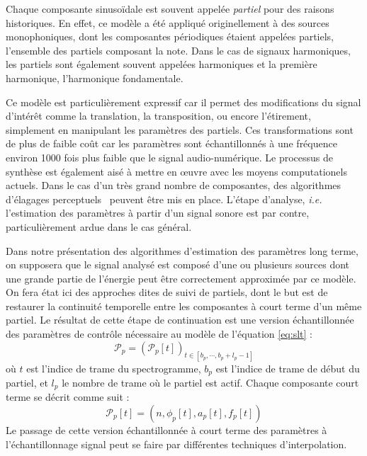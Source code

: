 Chaque composante sinusoïdale est souvent appelée \textsl{partiel} pour des raisons historiques. En effet, ce modèle a été appliqué originellement à des sources monophoniques, dont les composantes périodiques étaient appelées partiels, l'ensemble des partiels composant la note. Dans le cas de signaux harmoniques, les partiels sont également souvent appelées harmoniques et la première harmonique, l'harmonique fondamentale.



Ce modèle est particulièrement expressif car il permet des modifications du signal d'intérêt comme la translation, la transposition, ou encore l'étirement, simplement en manipulant les paramètres des partiels. Ces transformations sont de plus de faible coût car les paramètres sont échantillonnés à une fréquence environ 1000 fois plus faible que le signal audio-numérique. Le processus de synthèse est également aisé à mettre en \oe{}uvre avec les moyens computationels actuels. Dans le cas d'un très grand nombre de composantes, des algorithmes d'élagages perceptuels~\cite{lagrangeDafx01} peuvent être mis en place. L'étape d'analyse, \textit{i.e.} l'estimation des paramètres à partir d'un signal sonore est par contre, particulièrement ardue dans le cas général.

Dans notre présentation des algorithmes d'estimation des paramètres long terme, on supposera que le signal analysé est composé d'une ou plusieurs sources dont une grande partie de l'énergie peut être correctement approximée par ce modèle. On fera état ici des approches dites de suivi de partiels, dont le but est de \og restaurer \fg la continuité temporelle entre les composantes à court terme d'un même partiel. Le résultat de cette étape de continuation est une version échantillonnée des paramètres de contrôle nécessaire au modèle de l'équation \ref{eq:slt} :
\begin{equation}
\mathcal{P}_{p}=\left(\mathcal{P}_{p}[t]\right)_{t \in\left[b_{p}, \cdots, b_{p}+l_{p}-1\right]}
\end{equation}
où $t$ est l'indice de trame du spectrogramme, $b_{p}$ est l'indice de trame de début du partiel, et $l_{p}$ le nombre de trame où le partiel est actif. Chaque composante court terme se décrit comme suit :
\begin{equation}
\mathcal{P}_{p}[t]=\left(n, \phi_{p}[t], a_{p}[t], f_{p}[t]\right)
\end{equation}
Le passage de cette version échantillonnée à court terme des paramètres à l'échantillonnage signal peut se faire par différentes techniques d'interpolation.

